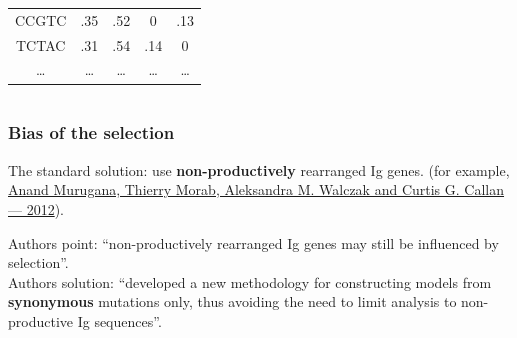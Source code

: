 \documentclass{beamer}\usepackage[]{graphicx}\usepackage[]{color}
\begin{document}
\begin{frame}
\begin{columns}[c]
\begin{column}{0.6\textwidth}
\begin{table}[]
\begin{tabular}{c|c|c|c|c}
                    CC{\color{red}G}TC   & .35                    & .52                    & 0                      & .13 \\
                    TC{\color{red}T}AC   & .31                    & .54                    & .14                    & 0   \\
                    \ldots & \ldots & \ldots & \ldots  & \ldots
                \end{tabular}
            \end{table}
        \end{column}
    \end{columns}
\end{frame}

\begin{frame}
    \frametitle{Bias of the selection}
    The standard solution: use \textbf{non-productively} rearranged Ig genes.
    (for example, \href{http://www.pnas.org/content/109/40/16161.full}{%
    Anand Murugana, Thierry Morab, Aleksandra M. Walczak and Curtis G. Callan --- 2012}).

    \bigskip
    \pause
    {\color{blue} Authors point}: ``non-productively rearranged Ig genes may still be influenced by selection''.\\

    \bigskip
    {\color{blue} Authors solution}: ``developed a new methodology for constructing models from \textbf{synonymous}
mutations only, thus avoiding the need to limit analysis
to non-productive Ig sequences''.
\end{frame}
\end{document}
